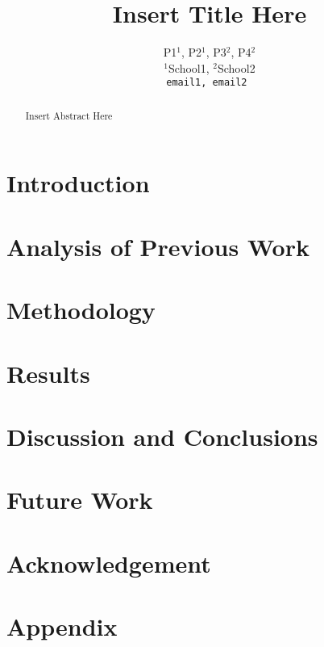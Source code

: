 \documentclass[10pt,twocolumn,letterpaper]{article}
\begin{document}
\title{Insert Title Here}

\author{
    P1$^1$, P2$^1$, P3$^2$, P4$^2$ \\
    $^1$School1, $^2$School2 \\
    {
        \tt\small email1, email2
    }
}

\maketitle

\begin{abstract}

Insert Abstract Here

\end{abstract}

\section{Introduction}

\section{Analysis of Previous Work}
\label{sec:previous}


\section{Methodology}


\section{Results}



\section{Discussion and Conclusions}
\label{sec:conclusion}


\section{Future Work}



\section{Acknowledgement}



{\small


}


\newpage
\appendix
\section{Appendix}
\end{document}
